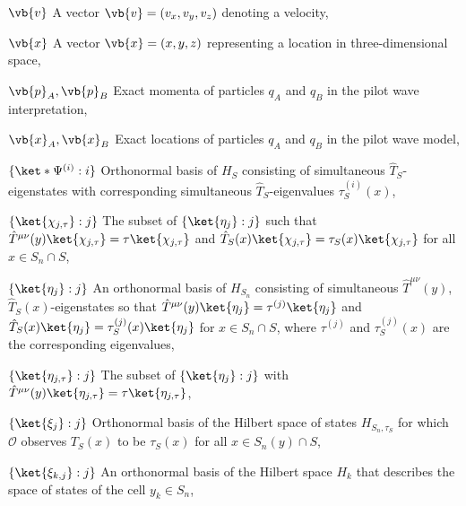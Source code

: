 \begin{thenomenclature}
  \item [{$\vb {v}$}]\begingroup A vector $\vb {v}= (v_x, v_y, v_z)$ denoting a velocity, \nomrefpage {}
  \item [{$\vb {x}$}]\begingroup A vector $\vb {x}= (x, y, z)$ representing a location in three-dimensional space, \nomrefpage {}
  \item [{$\vb{p}_A, \vb{p}_B$}]\begingroup Exact momenta of particles $q_A$ and $q_B$ in the pilot wave interpretation, \nomrefpage{}
  \item [{$\vb{x}_A, \vb{x}_B$}]\begingroup Exact locations of particles $q_A$ and $q_B$ in the pilot wave model, \nomrefpage{}
  \item [{$\{\ket*{\Psi^{(i)}}:i\}$}]\begingroup Orthonormal basis of $H_S$ consisting of simultaneous $\hat{T}_S$-eigenstates with corresponding simultaneous $\hat{T}_S$-eigenvalues $\tau^{(i)}_S(x)$, \nomrefpage{}
  \item [{$\{\ket{\chi_{j,\tau}}:j\}$}]\begingroup The subset of $\{\ket{\eta_j}:j\}$ such that $\hat{T}^{\mu\nu}(y)\ket{\chi_{j,\tau}}=\tau\ket{\chi_{j,\tau}}$ and $\hat{T}_S(x)\ket{\chi_{j,\tau}}=\tau_S(x)\ket{\chi_{j,\tau}}$ for all $x\in S_n\cap S$, \nomrefpage{}
  \item [{$\{\ket{\eta_j}:j\}$}]\begingroup An orthonormal basis of $H_{S_n}$ consisting of simultaneous $\hat{T}^{\mu\nu}(y)$, $\hat{T}_S(x)$-eigenstates so that $\hat{T}^{\mu\nu}(y)\ket{\eta_j}=\tau^{(j)}\ket{\eta_j}$ and $\hat{T}_{S}(x)\ket{\eta_j}=\tau_S^{(j)}(x)\ket{\eta_j}$ for $x\in S_n\cap S$, where $\tau^{(j)}$ and $\tau_S^{(j)}(x)$ are the corresponding eigenvalues, \nomrefpage{}
  \item [{$\{\ket{\eta_{j,\tau}}:j\}$}]\begingroup The subset of  $\{\ket{\eta_j}:j\}$ with $\hat{T}^{\mu\nu}(y)\ket{\eta_{j,\tau}}=\tau\ket{\eta_{j,\tau}}$, \nomrefpage{}
  \item [{$\{\ket{\xi_j}:j\}$}]\begingroup Orthonormal basis of the Hilbert space of states $H_{S_n,\tau_S}$ for which $\mathcal{O}$ observes $T_S(x)$ to be $\tau_S(x)$ for all $x\in S_n(y)\cap S$, \nomrefpage{}
  \item [{$\{\ket{\xi_{k,j}}:j\}$}]\begingroup An orthonormal basis of the Hilbert space $H_k$ that describes the space of states of the cell $y_k\in S_n$, \nomrefpage{}

\end{thenomenclature}
